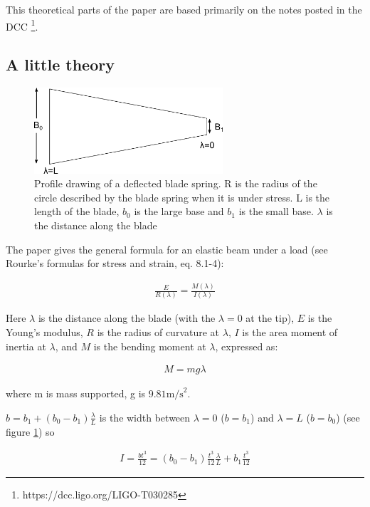 This theoretical parts of the paper are based primarily on the notes posted in the DCC
\footnote{https://dcc.ligo.org/LIGO-T030285}.

\subsection{A little theory}
\label{sec:theory}

\begin{figure}[ht]		
\centering
\includegraphics[width=7cm]{figures/suspensions/bladeWidth.png}
	\caption[Blade springs]{Profile drawing of a deflected blade spring. R is the radius of the circle described by the blade spring
	when it is under stress. L is the length of the blade, $b_0$ is the large base and $b_1$ is the small base. $\lambda$ is the distance along the blade}
	\label{fig:bladeIllustration}
\end{figure}

The paper gives the general formula for an elastic beam under a load (see Rourke's formulas for stress and strain, eq. 8.1-4):

\begin{eqnarray}
\frac{E}{R(\lambda)} = \frac{M(\lambda)}{I(\lambda)}
\label{eq:R}
\end{eqnarray}
 
Here $\lambda$ is the distance along the blade (with the $\lambda=0$ at the tip), $E$ is the Young's modulus, $R$ is the radius of curvature at $\lambda$, $I$ is the area moment of inertia at $\lambda$, and $M$ is the bending moment at $\lambda$, expressed as: 

\begin{eqnarray}
M = m g \lambda
\label{eq:M}
\end{eqnarray}

where m is mass supported, g is $9.81 \mbox{m/s}^2$.

$b = b_1+(b_0-b_1) \frac{\lambda}{L}$ is the width between $\lambda=0$ ($b=b_1$) and $\lambda=L$ ($b=b_0$) (see figure \ref{fig:bladeIllustration}) so

\begin{eqnarray}
I = \frac{b t^3}{12} = (b_0-b_1)\frac{t^3}{12} \frac{\lambda}{L}+b_1\frac{t^3}{12}
\label{eq:I1}
\end{eqnarray}


